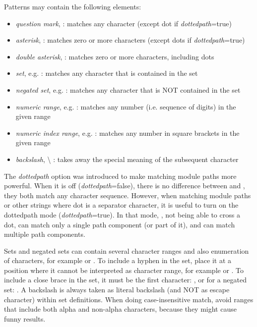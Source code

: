 Patterns may contain the following elements:

\begin{itemize}
  \item \textit{question mark},  : matches any character (except dot if \textit{dottedpath}=true)
  \item \textit{asterisk}, \ttt{*} : matches zero or more characters (except dots if \textit{dottedpath}=true)
  \item \textit{double asterisk}, \ttt{**} : matches zero or more characters, including dots
  \item \textit{set}, e.g.  : matches any character that is contained in the set
  \item \textit{negated set}, e.g. : matches any character that is NOT contained in the set
  \item \textit{numeric range}, e.g.  : matches any number (i.e. sequence of digits) in the given range
  \item \textit{numeric index range}, e.g. \ttt{[38..150]} : matches any number in square brackets in the given range
  \item \textit{backslash}, {\textbackslash} : takes away the special meaning of the subsequent character
\end{itemize}

\begin{note}
The \textit{dottedpath} option was introduced to make matching {\opp}
module paths more powerful. When it is off (\textit{dottedpath}=false),
there is no difference between \ttt{*} and \ttt{**}, they both match any
character sequence. However, when matching {\opp} module paths or other
strings where dot is a separator character, it is useful to turn on the
dottedpath mode (\textit{dottedpath}=true). In that mode, \ttt{*}, not
being able to cross a dot, can match only a single path component (or part
of it), and \ttt{**} can match multiple path components.
\end{note}

Sets and negated sets can contain several character ranges and also
enumeration of characters, for example  or
. To include a hyphen in the set, place it at a position
where it cannot be interpreted as character range, for example
 or . To include a close brace in
the set, it must be the first character: , or for a negated
set: . A backslash is always taken as
literal backslash (and NOT as escape character) within set definitions.
When doing case-insensitive match, avoid ranges that include both alpha and
non-alpha characters, because they might cause funny results.

